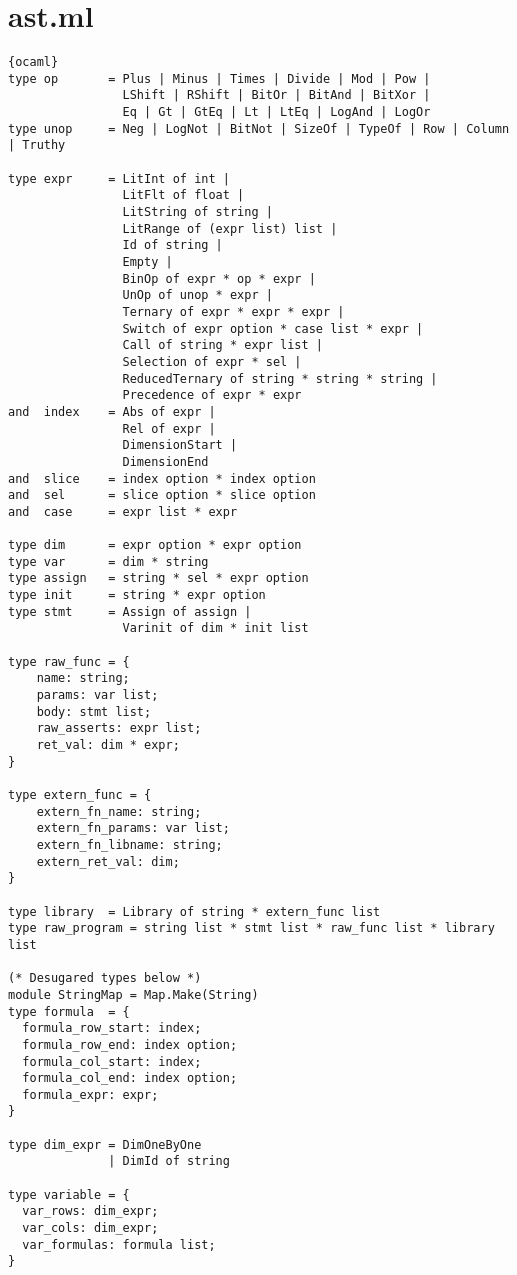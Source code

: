 \section{ast.ml}
\begin{lstlisting}{ocaml}
type op       = Plus | Minus | Times | Divide | Mod | Pow |
                LShift | RShift | BitOr | BitAnd | BitXor |
                Eq | Gt | GtEq | Lt | LtEq | LogAnd | LogOr
type unop     = Neg | LogNot | BitNot | SizeOf | TypeOf | Row | Column | Truthy

type expr     = LitInt of int |
                LitFlt of float |
                LitString of string |
                LitRange of (expr list) list |
                Id of string |
                Empty |
                BinOp of expr * op * expr |
                UnOp of unop * expr |
                Ternary of expr * expr * expr |
                Switch of expr option * case list * expr |
                Call of string * expr list |
                Selection of expr * sel |
                ReducedTernary of string * string * string |
                Precedence of expr * expr
and  index    = Abs of expr |
                Rel of expr |
                DimensionStart |
                DimensionEnd
and  slice    = index option * index option
and  sel      = slice option * slice option
and  case     = expr list * expr

type dim      = expr option * expr option
type var      = dim * string
type assign   = string * sel * expr option
type init     = string * expr option
type stmt     = Assign of assign |
                Varinit of dim * init list

type raw_func = {
    name: string;
    params: var list;
    body: stmt list;
    raw_asserts: expr list;
    ret_val: dim * expr;
}

type extern_func = {
    extern_fn_name: string;
    extern_fn_params: var list;
    extern_fn_libname: string;
    extern_ret_val: dim;
}

type library  = Library of string * extern_func list
type raw_program = string list * stmt list * raw_func list * library list

(* Desugared types below *)
module StringMap = Map.Make(String)
type formula  = {
  formula_row_start: index;
  formula_row_end: index option;
  formula_col_start: index;
  formula_col_end: index option;
  formula_expr: expr;
}

type dim_expr = DimOneByOne
              | DimId of string

type variable = {
  var_rows: dim_expr;
  var_cols: dim_expr;
  var_formulas: formula list;
}


\end{lstlisting}
